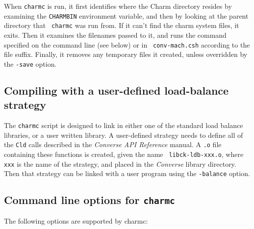 When {\tt charmc} is run, it first identifies where the Charm
directory resides by examining the {\tt CHARMBIN} environment
variable, and then by looking at the parent directory that {\tt
charmc} was run from.  If it can't find the charm system files, it
exits.  Then it examines the filenames passed to it, and runs the
command specified on the command line (see below) or in {\tt
conv-mach.csh} according to the file suffix.  Finally, it removes any
temporary files it created, unless overridden by the {\tt -save}
option.

\subsection{Compiling with a user-defined load-balance strategy}

The {\tt charmc} script is designed to link in either one of the
standard load balance libraries, or a user written library.  A
user-defined strategy needs to define all of the {\tt Cld} calls
described in the {\em Converse API Reference} manual.  A {\tt .o} file
containing these functions is created, given the name {\tt
libck-ldb-xxx.o}, where {\tt xxx} is the name of the strategy, and
placed in the {\em Converse} library directory.  Then that strategy
can be linked with a user program using the {\tt -balance} option.

\subsection{Command line options for {\tt charmc}}

The following options are supported by charmc:


